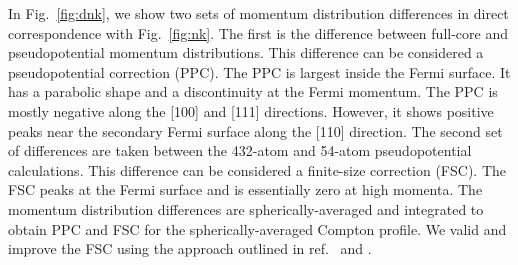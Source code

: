\documentclass[aps,prb,showpacs,preprintnumbers,amsmath,amssymb,superscriptaddress,twocolumn]{revtex4}
\begin{document}
In Fig.~\ref{fig:dnk}, we show two sets of momentum distribution differences in direct correspondence with Fig.~\ref{fig:nk}. The first is the difference between full-core and pseudopotential momentum distributions. This difference can be considered a pseudopotential correction (PPC). The PPC is largest inside the Fermi surface. It has a parabolic shape and a discontinuity at the Fermi momentum. The PPC is mostly negative along the [100] and [111] directions. However, it shows positive peaks near the secondary Fermi surface along the [110] direction. The second set of differences are taken between the 432-atom and 54-atom pseudopotential calculations. This difference can be considered a finite-size correction (FSC). The FSC peaks at the Fermi surface and is essentially zero at high momenta. The momentum distribution differences are spherically-averaged and integrated to obtain PPC and FSC for the spherically-averaged Compton profile. We valid and improve the FSC using the approach outlined in ref.~\cite{Holzmann2009} and \cite{Holzmann2011}.
\end{document}
